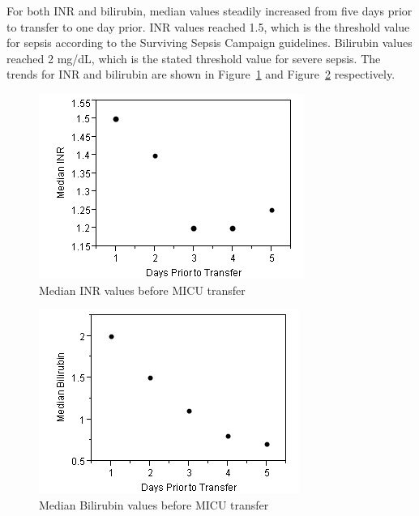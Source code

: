 \documentclass{sig-alternate}
\begin{document}
For both INR and bilirubin, median values steadily increased from five days prior to transfer to one day prior.  INR values reached 1.5, which is the threshold value for sepsis according to the Surviving Sepsis Campaign guidelines.  Bilirubin values reached 2 mg/dL, which is the stated threshold value for severe sepsis.  The trends for INR and bilirubin are shown in  Figure~\ref{fig:inr} and  Figure~\ref{fig:bilirubin} respectively.

\begin{figure}
	\begin{center}
		\includegraphics[width=1.0\linewidth]{INRGraph.png}
	\end{center}
	\caption{Median INR values before MICU transfer}
	\label{fig:inr}
\end{figure}

\begin{figure}
	\begin{center}
		\includegraphics[width=1.0\linewidth]{BilirubinGraph.png}
	\end{center}
	\caption{Median Bilirubin values before MICU transfer}
	\label{fig:bilirubin}
\end{figure}
\end{document}
